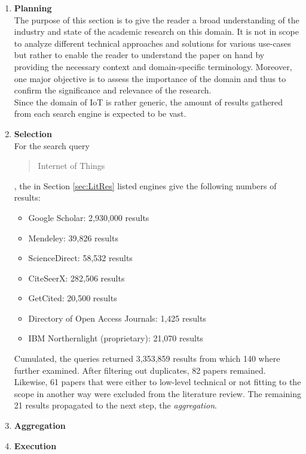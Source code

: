 \begin{enumerate}
    \item
    \textbf{Planning}\\
    The purpose of this section is to give the reader a broad understanding of the industry and state of the academic research on this domain. It is not in scope to analyze different technical approaches and solutions for various use-cases but rather to enable the reader to understand the paper on hand by providing the necessary context and domain-specific terminology. Moreover, one major objective is to assess the importance of the domain and thus to confirm the significance and relevance of the research.\\
    Since the domain of \acf{IoT} is rather generic, the amount of results gathered from each search engine is expected to be vast.
    
    \item
    \textbf{Selection}\\
    For the search query \blockquote{Internet of Things}, the in Section \ref{sec:LitRes} listed engines give the following numbers of results:
    
    \begin{itemize}
        \renewcommand\labelitemi{--}
        \item Google Scholar: 2,930,000 results
        \item Mendeley: 39,826 results
        \item ScienceDirect: 58,532 results
        \item CiteSeerX: 282,506 results
        \item GetCited: 20,500 results
        \item Directory of Open Access Journals: 1,425 results
        \item IBM Northernlight (proprietary): 21,070 results
    \end{itemize}
    
    Cumulated, the queries returned 3,353,859 results from which 140 where further examined. After filtering out duplicates, 82 papers remained. Likewise, 61 papers that were either to low-level technical or not fitting to the scope in another way were excluded from the literature review. The remaining 21 results propagated to the next step, the \textit{aggregation}.
    
    \item
    \textbf{Aggregation}\\
    
    \item
    \textbf{Execution}\\
    
    
\end{enumerate}


